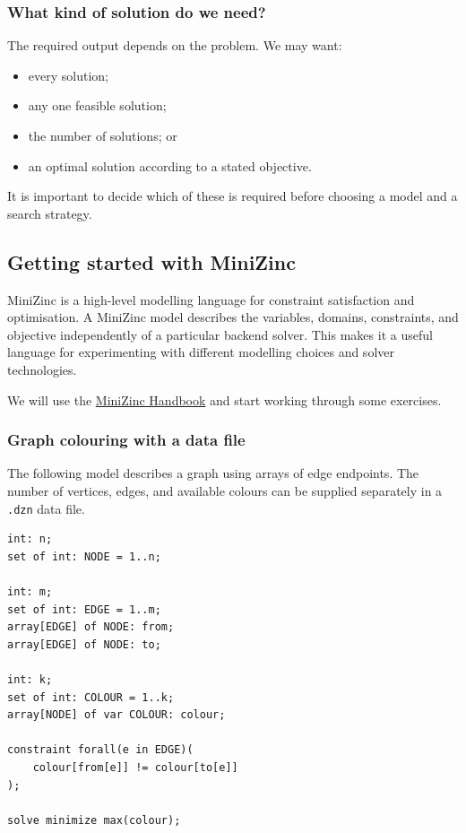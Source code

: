 \documentclass[11pt]{article}
\begin{document}
\subsubsection{What kind of solution do we need?}

The required output depends on the problem. We may want:
\begin{itemize}
    \item every solution;
    \item any one feasible solution;
    \item the number of solutions; or
    \item an optimal solution according to a stated objective.
\end{itemize}
It is important to decide which of these is required before choosing a model
and a search strategy.

\subsection{Getting started with MiniZinc}

MiniZinc is a high-level modelling language for constraint satisfaction and
optimisation. A MiniZinc model describes the variables, domains, constraints,
and objective independently of a particular backend solver. This makes it a
useful language for experimenting with different modelling choices and solver
technologies.

We will use the \href{https://docs.minizinc.dev/en/stable/index.html}{MiniZinc Handbook}
and start working through some exercises.

\subsubsection{Graph colouring with a data file}

The following model describes a graph using arrays of edge endpoints. The
number of vertices, edges, and available colours can be supplied separately in
a \texttt{.dzn} data file.

\begin{verbatim}
int: n;
set of int: NODE = 1..n;

int: m;
set of int: EDGE = 1..m;
array[EDGE] of NODE: from;
array[EDGE] of NODE: to;

int: k;
set of int: COLOUR = 1..k;
array[NODE] of var COLOUR: colour;

constraint forall(e in EDGE)(
    colour[from[e]] != colour[to[e]]
);

solve minimize max(colour);
\end{verbatim}
\end{document}
